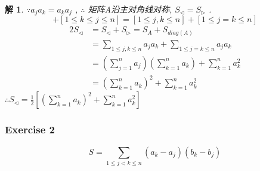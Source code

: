 \documentclass[mode=geye, chinesefont=founder]{elegantnote}
\newtheorem{solve}{解}
\begin{document}
\begin{solve}
    $ \because a_j a_k = a_k a_j $ , $ \therefore  $ 矩阵A沿主对角线对称, $ S_{\triangleleft} = S_{\triangleright} $ .
    \begin{equation*}
        [1\leqslant j \leqslant k \leqslant n] + [1\leqslant k \leqslant j \leqslant n] =[1\leqslant j , k \leqslant n] + [1\leqslant j = k \leqslant n]
    \end{equation*}
    \begin{align*}
        2S_{\triangleleft} &= S_{\triangleleft}+S_{\triangleright} = S_{A}+S_{diag(A)} \\
        &= \sum_{1\leqslant j , k \leqslant n} a_j a_k + \sum_{1\leqslant j = k \leqslant n} a_j a_k\\
        &= \left(\sum_{j=1}^{n} a_j\right)\left(\sum_{k=1}^{n} a_k\right) + \sum_{k=1}^{n} a_k^2\\
        &= \left(\sum_{k=1}^{n} a_k\right)^2 + \sum_{k=1}^{n} a_k^2
    \end{align*}
    $ \therefore S_{\triangleleft} = \frac{1}{2}[\left(\sum_{k=1}^{n} a_k\right)^2 + \sum_{k=1}^{n} a_k^2] $ 
\end{solve}

\subsubsection{Exercise 2}

\begin{equation}
    S = \sum_{1\leqslant j < k \leqslant n} (a_k-a_j)(b_k-b_j)
\end{equation}
\end{document}
